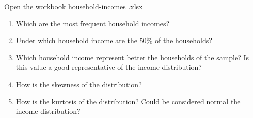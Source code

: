 \begin{enumerate}[leftmargin=*,resume]
Open the workbook
\href{http://aprendeconalf.es/office/excel/exercises/descriptive-statistics/household-incomes.xlsx}{\textsf{household-incomes
.xlsx}}
\begin{enumerate}
\item Which are the most frequent household incomes?
\item Under which household income are the 50\% of the households? 
\item Which household income represent better the households of the sample? Is this value a good representative
of the income distribution?
\item How is the skewness of the distribution?
\item How is the kurtosis of the distribution? Could be considered normal the income distribution?
\end{enumerate}

\end{enumerate}
